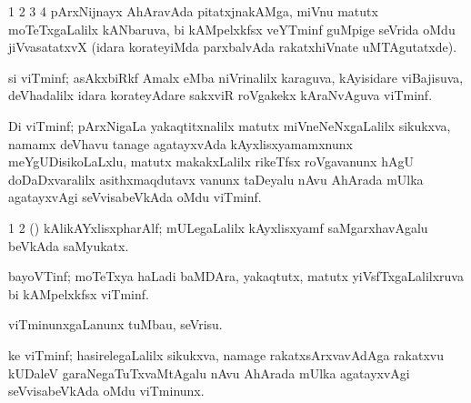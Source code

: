 {{{{{{{{{{{\noindent 
\gl{\pagu}
\expl{}
\bmng
\bnum
\num{1} 
\num{2} 
\num{3} 
\num{4} pArxNijnayx AhAravAda pitatxjnakAMga, miVnu matutx moTeTxgaLalilx kANbaruva, bi kAMpelxkfsx veYTminf guMpige seVrida oMdu jiVvasatatxvX (idara korateyiMda parxbalvAda rakatxhiVnate uMTAgutatxde). 
\enum
\emng
\eentry

\bentry
{}
\gl{\nA}
\expl{}
\bmng
 si viTminf; asAkxbiRkf Amalx eMba niVrinalilx karaguva, kAyisidare viBajisuva, deVhadalilx idara korateyAdare sakxviR roVgakekx kAraNvAguva viTminf. 
\emng
\eentry

\bentry
{}
\gl{\nA}
\expl{}
\bmng
Di viTminf; pArxNigaLa yakaqtitxnalilx matutx miVneNeNxgaLalilx sikukxva, namamx deVhavu tanage agatayxvAda kAyxlisxyamamxnunx meYgUDisikoLaLxlu, matutx makakxLalilx rikeTfsx roVgavanunx hAgU doDaDxvaralilx asithxmaqdutavx  vanunx taDeyalu nAvu AhArada mUlka agatayxvAgi seVvisabeVkAda oMdu viTminf. 
\emng

\noindent 
\gl{\pagu}
\expl{}
\bmng
\bnum
\num{1} 
\num{2} (\jiVra) kAlikAYxlisxpharAlf; mULegaLalilx kAyxlisxyamf saMgarxhavAgalu beVkAda saMyukatx. 
\enum
\emng
\eentry

\bentry
{}
\gl{\nA}
\expl{}
\bmng
\emng
\eentry

\bentry
{}
\gl{\nA}
\expl{}
\bmng
 bayoVTinf; moTeTxya haLadi baMDAra, yakaqtutx, matutx yiVsfTxgaLalilxruva bi kAMpelxkfsx viTminf. 
\emng
\eentry

\bentry
{} 
\gl{\sakirx}
\expl{}
\bmng
\emng
\eentry

\bentry
{} 
\gl{\sakirx}
\expl{}
\bmng
 viTminunxgaLanunx tuMbau, seVrisu. 
\emng
\eentry

\bentry
{}
\gl{\nA}
\expl{}
\bmng
 ke viTminf; hasirelegaLalilx sikukxva, namage rakatxsArxvavAdAga rakatxvu kUDaleV garaNegaTuTxvaMtAgalu nAvu AhArada mUlka agatayxvAgi seVvisabeVkAda oMdu viTminunx. 
\emng

}}}}}}}}}}}
